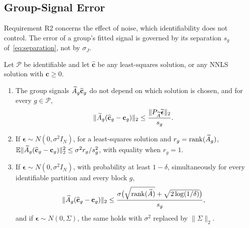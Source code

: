 \subsection{Group-Signal Error}

Requirement R2 concerns the effect of noise, which identifiability does not control.
The error of a group's fitted signal is governed by its separation \(s_g\)
of~\eqref{eq:separation}, not by \(\sigma_J\).

\begin{theorem}
\label{thm:group_error}
Let \(\mathcal P\) be identifiable and let \(\widehat{\mathbf c}\) be any
least-squares solution, or any NNLS solution with \(\mathbf c\ge0\).
\begin{enumerate}[label=(\alph*),leftmargin=*,itemsep=0pt,topsep=2pt]
  \item The group signals \(\widetilde A_g\widehat{\mathbf c}_g\) do not depend on which
  solution is chosen, and for every \(g\in\mathcal P\),
  \begin{equation}
  \|\widetilde A_g(\widehat{\mathbf c}_g-\mathbf c_g)\|_2
  \le
  \frac{\|P_{\widetilde A}\widetilde{\boldsymbol\epsilon}\|_2}{s_g}.
  \label{eq:group_bound}
  \end{equation}
  \item If \(\boldsymbol\epsilon\sim N(0,\sigma^2I_N)\), for a least-squares solution and
  \(r_g=\operatorname{rank}(\widetilde A_g)\),
  \(\mathbb E\|\widetilde A_g(\widehat{\mathbf c}_g-\mathbf c_g)\|_2^2\le\sigma^2r_g/s_g^2\), with
  equality when \(r_g=1\).
  \item If \(\boldsymbol\epsilon\sim N(0,\sigma^2I_N)\), with probability at least
  \(1-\delta\), simultaneously for every identifiable partition and every block \(g\),
  \begin{equation}
  \|\widetilde A_g(\widehat{\mathbf c}_g-\mathbf c_g)\|_2
  \le
  \frac{\sigma\bigl(\sqrt{\operatorname{rank}(\widetilde A)}+\sqrt{2\log(1/\delta)}\bigr)}{s_g},
  \label{eq:group_bound_gauss}
  \end{equation}
  and if \(\boldsymbol\epsilon\sim N(0,\Sigma)\), the same holds with \(\sigma^2\)
  replaced by \(\|\Sigma\|_2\).
\end{enumerate}
\end{theorem}

